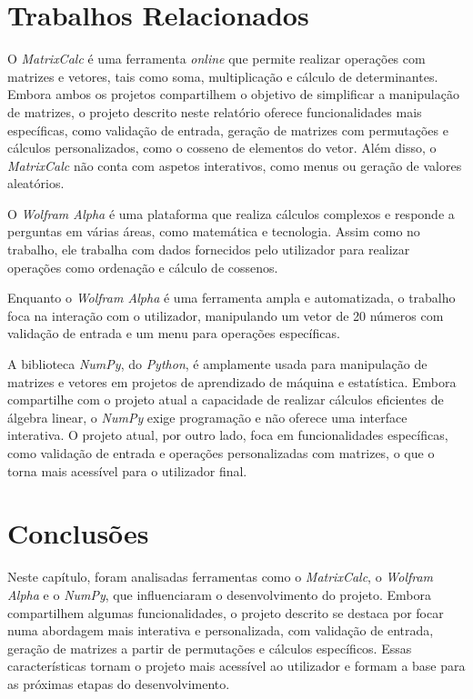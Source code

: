 \section{Trabalhos Relacionados}
\label{chap2:sec:trab-relacionado}
O \textit{MatrixCalc}\cite{matrixcalcCalculadoraMatrizes} é uma ferramenta \textit{online} que permite realizar operações com matrizes e vetores, tais como soma, multiplicação e cálculo de determinantes. Embora ambos os projetos compartilhem o objetivo de simplificar a manipulação de matrizes, o projeto descrito neste relatório oferece funcionalidades mais específicas, como validação de entrada, geração de matrizes com permutações e cálculos personalizados, como o cosseno de elementos do vetor. Além disso, o \textit{MatrixCalc} não conta com aspetos interativos, como menus ou geração de valores aleatórios. \par
O \textit{Wolfram Alpha}\cite{wolframalphaWolframAlphaMaking} é uma plataforma que realiza cálculos complexos e responde a perguntas em várias áreas, como matemática e tecnologia. Assim como no trabalho, ele trabalha com dados fornecidos pelo utilizador para realizar operações como ordenação e cálculo de cossenos. \par
Enquanto o \textit{Wolfram Alpha} é uma ferramenta ampla e automatizada, o trabalho foca na interação com o utilizador, manipulando um vetor de 20 números com validação de entrada e um menu para operações específicas. \par
A biblioteca \textit{NumPy}\cite{numpyNumPy}, do \textit{Python}\cite{pythonWelcomePythonorg}, é amplamente usada para manipulação de matrizes e vetores em projetos de aprendizado de máquina e estatística. Embora compartilhe com o projeto atual a capacidade de realizar cálculos eficientes de álgebra linear, o \textit{NumPy} exige programação e não oferece uma interface interativa. O projeto atual, por outro lado, foca em funcionalidades específicas, como validação de entrada e operações personalizadas com matrizes, o que o torna mais acessível para o utilizador final.


\section{Conclusões}
\label{chap2:sec:concs}
Neste capítulo, foram analisadas ferramentas como o \textit{MatrixCalc}, o \textit{Wolfram Alpha} e o \textit{NumPy}, que influenciaram o desenvolvimento do projeto. Embora compartilhem algumas funcionalidades, o projeto descrito se destaca por focar numa abordagem mais interativa e personalizada, com validação de entrada, geração de matrizes a partir de permutações e cálculos específicos. Essas características tornam o projeto mais acessível ao utilizador e formam a base para as próximas etapas do desenvolvimento.